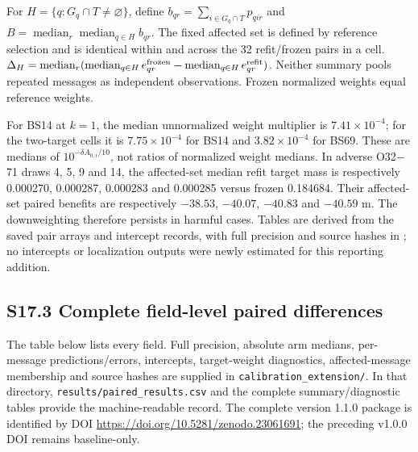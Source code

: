 \documentclass[journal,onecolumn,10pt]{IEEEtran}
\begin{document}
For $H=\{q:G_q\cap T\ne\varnothing\}$, define $b_{qr}=\sum_{i\in G_q\cap T}p_{qir}$ and $B=\operatorname{median}_r\operatorname{median}_{q\in H}b_{qr}$. The fixed affected set is defined by reference selection and is identical within and across the 32 refit/frozen pairs in a cell. $\Delta_H=\operatorname{median}_r(\operatorname{median}_{q\in H}e^{\rm frozen}_{qr}-\operatorname{median}_{q\in H}e^{\rm refit}_{qr})$. Neither summary pools repeated messages as independent observations. Frozen normalized weights equal reference weights.




For BS14 at $k=1$, the median unnormalized weight multiplier is $7.41\times10^{-4}$; for the two-target cells it is $7.75\times10^{-4}$ for BS14 and $3.82\times10^{-4}$ for BS69. These are medians of $10^{-\delta A_{0,i}/10}$, not ratios of normalized weight medians. In adverse O32$-$71 draws 4, 5, 9 and 14, the affected-set median refit target mass is respectively 0.000270, 0.000287, 0.000283 and 0.000285 versus frozen 0.184684. Their affected-set paired benefits are respectively $-38.53$, $-40.07$, $-40.83$ and $-40.59$ m. The downweighting therefore persists in harmful cases. Tables are derived from the saved pair arrays and intercept records, with full precision and source hashes in ; no intercepts or localization outputs were newly estimated for this reporting addition.

\subsection*{S17.3 Complete field-level paired differences}
The table below lists every field. Full precision, absolute arm medians, per-message predictions/errors, intercepts, target-weight diagnostics, affected-message membership and source hashes are supplied in \texttt{calibration\_extension/}. In that directory, \texttt{results/paired\_results.csv} and the complete summary/diagnostic tables provide the machine-readable record. The complete version 1.1.0 package is identified by DOI \url{https://doi.org/10.5281/zenodo.23061691}; the preceding v1.0.0 DOI remains baseline-only.
\end{document}
